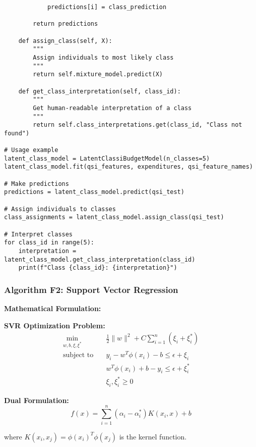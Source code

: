 \documentclass[12pt]{article}
\begin{document}
\begin{lstlisting}
            predictions[i] = class_prediction
        
        return predictions
    
    def assign_class(self, X):
        """
        Assign individuals to most likely class
        """
        return self.mixture_model.predict(X)
    
    def get_class_interpretation(self, class_id):
        """
        Get human-readable interpretation of a class
        """
        return self.class_interpretations.get(class_id, "Class not found")

# Usage example
latent_class_model = LatentClassiBudgetModel(n_classes=5)
latent_class_model.fit(qsi_features, expenditures, qsi_feature_names)

# Make predictions
predictions = latent_class_model.predict(qsi_test)

# Assign individuals to classes
class_assignments = latent_class_model.assign_class(qsi_test)

# Interpret classes
for class_id in range(5):
    interpretation = latent_class_model.get_class_interpretation(class_id)
    print(f"Class {class_id}: {interpretation}")
\end{lstlisting}

\subsubsection{Algorithm F2: Support Vector Regression}

\textbf{Mathematical Formulation:}

\textbf{SVR Optimization Problem:}
\begin{align}
\min_{w,b,\xi,\xi^*} \quad & \frac{1}{2}\|w\|^2 + C\sum_{i=1}^{n}(\xi_i + \xi_i^*) \\
\text{subject to} \quad & y_i - w^T\phi(x_i) - b \leq \epsilon + \xi_i \\
& w^T\phi(x_i) + b - y_i \leq \epsilon + \xi_i^* \\
& \xi_i, \xi_i^* \geq 0
\end{align}

\textbf{Dual Formulation:}
\begin{equation}
f(x) = \sum_{i=1}^{n}(\alpha_i - \alpha_i^*)K(x_i, x) + b
\end{equation}

where $K(x_i, x_j) = \phi(x_i)^T\phi(x_j)$ is the kernel function.
\end{document}
